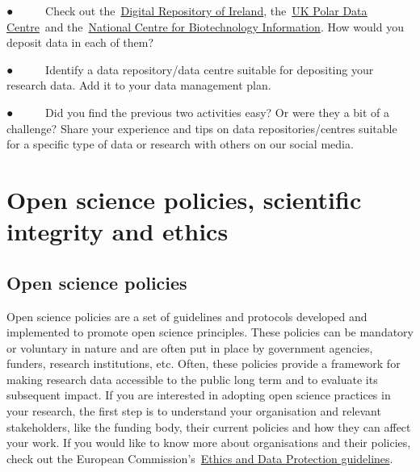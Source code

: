 \documentclass[
]{book}
\begin{document}
● ~ ~ ~ Check out the~\href{https://dri.ie/}{}\href{https://dri.ie/}{Digital Repository of Ireland}, the~\href{https://www.bas.ac.uk/data/uk-pdc/}{}\href{https://www.bas.ac.uk/data/uk-pdc/}{UK Polar Data Centre}~and the~\href{https://www.ncbi.nlm.nih.gov/}{}\href{https://www.ncbi.nlm.nih.gov/}{National Centre for Biotechnology Information}. How would you deposit data in each of them?

● ~ ~ ~ Identify a data repository/data centre suitable for depositing your research data. Add it to your data management plan.

● ~ ~ ~ Did you find the previous two activities easy? Or were they a bit of a challenge? Share your experience and tips on data repositories/centres suitable for a specific type of data or research with others on our social media.

\hypertarget{open-science-policies-scientific-integrity-and-ethics}{%
\chapter{\texorpdfstring{\textbf{Open science policies, scientific integrity and ethics}}{Open science policies, scientific integrity and ethics}}\label{open-science-policies-scientific-integrity-and-ethics}}

\hypertarget{open-science-policies}{%
\section{\texorpdfstring{\textbf{Open science policies}}{Open science policies}}\label{open-science-policies}}

Open science policies are a set of guidelines and protocols developed and implemented to promote open science principles. These policies can be mandatory or voluntary in nature and are often put in place by government agencies, funders, research institutions, etc. Often, these policies provide a framework for making research data accessible to the public long term and to evaluate its subsequent impact. If you are interested in adopting open science practices in your research, the first step is to understand your organisation and relevant stakeholders, like the funding body, their current policies and how they can affect your work. If you would like to know more about organisations and their policies, check out the European Commission's~\href{https://ec.europa.eu/research/participants/data/ref/h2020/grants_manual/hi/ethics/h2020_hi_ethics-data-protection_en.pdf}{}\href{https://ec.europa.eu/research/participants/data/ref/h2020/grants_manual/hi/ethics/h2020_hi_ethics-data-protection_en.pdf}{Ethics and Data Protection guidelines}.~
\end{document}
